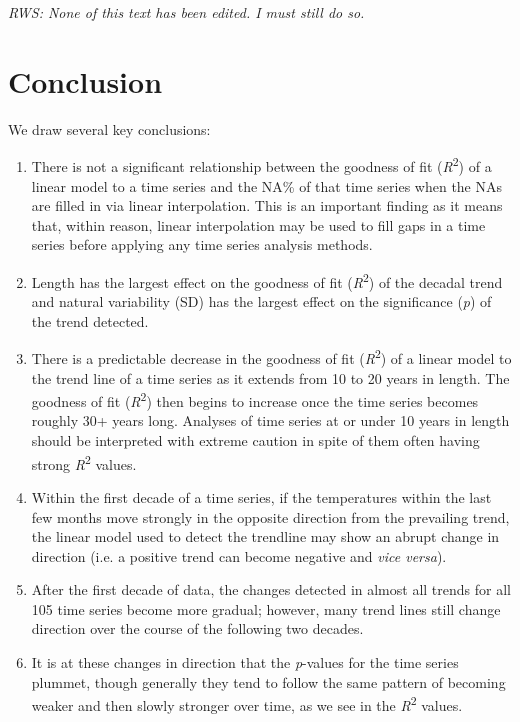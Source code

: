 \documentclass[]{ametsoc}
\begin{document}
\emph{RWS: None of this text has been edited. I must still do so.}
\section{Conclusion}
We draw several key conclusions:

\begin{enumerate}
\item There is not a significant relationship between the goodness of fit (\emph{R}\textsuperscript{2}) of a linear model to a time series and the NA\% of that time series when the NAs are filled in via linear interpolation. This is an important finding as it means that, within reason, linear interpolation may be used to fill gaps in a time series before applying any time series analysis methods.

\item Length has the largest effect on the goodness of fit (\emph{R}\textsuperscript{2}) of the decadal trend and natural variability (SD) has the largest effect on the significance (\emph{p}) of the trend detected.

\item There is a predictable decrease in the goodness of fit (\emph{R}\textsuperscript{2}) of a linear model to the trend line of a time series as it extends from 10 to 20 years in length. The goodness of fit (\emph{R}\textsuperscript{2}) then begins to increase once the time series becomes roughly 30+ years long. Analyses of time series at or under 10 years in length should be interpreted with extreme caution in spite of them often having strong \emph{R}\textsuperscript{2} values.

\item Within the first decade of a time series, if the temperatures within the last few months move strongly in the opposite direction from the prevailing trend, the linear model used to detect the trendline may show an abrupt change in direction (i.e. a positive trend can become negative and \emph{vice versa}).

\item After the first decade of data, the changes detected in almost all trends for all 105 time series become more gradual; however, many trend lines still change direction over the course of the following two decades.

\item It is at these changes in direction that the \emph{p}-values for the time series plummet, though generally they tend to follow the same pattern of becoming weaker and then slowly stronger over time, as we see in the \emph{R}\textsuperscript{2} values.


\end{enumerate}
\end{document}
